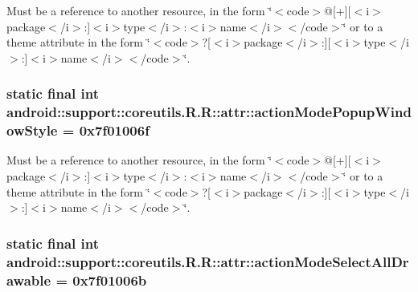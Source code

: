 Must be a reference to another resource, in the form \char`\"{}$<$code$>$@\mbox{[}+\mbox{]}\mbox{[}$<$i$>$package$<$/i$>$:\mbox{]}$<$i$>$type$<$/i$>$:$<$i$>$name$<$/i$>$$<$/code$>$\char`\"{} or to a theme attribute in the form \char`\"{}$<$code$>$?\mbox{[}$<$i$>$package$<$/i$>$:\mbox{]}\mbox{[}$<$i$>$type$<$/i$>$:\mbox{]}$<$i$>$name$<$/i$>$$<$/code$>$\char`\"{}. \hypertarget{classandroid_1_1support_1_1coreutils_1_1_r_1_1attr_e9eb91a12e00c5257b472c451edceb5f}{
\subsubsection[{actionModePopupWindowStyle}]{\setlength{\rightskip}{0pt plus 5cm}static final int android::support::coreutils.R.R::attr::actionModePopupWindowStyle = 0x7f01006f}}
\label{classandroid_1_1support_1_1coreutils_1_1_r_1_1attr_e9eb91a12e00c5257b472c451edceb5f}


Must be a reference to another resource, in the form \char`\"{}$<$code$>$@\mbox{[}+\mbox{]}\mbox{[}$<$i$>$package$<$/i$>$:\mbox{]}$<$i$>$type$<$/i$>$:$<$i$>$name$<$/i$>$$<$/code$>$\char`\"{} or to a theme attribute in the form \char`\"{}$<$code$>$?\mbox{[}$<$i$>$package$<$/i$>$:\mbox{]}\mbox{[}$<$i$>$type$<$/i$>$:\mbox{]}$<$i$>$name$<$/i$>$$<$/code$>$\char`\"{}. \hypertarget{classandroid_1_1support_1_1coreutils_1_1_r_1_1attr_596f5da4acff9096eb6d62dd734e0846}{
\subsubsection[{actionModeSelectAllDrawable}]{\setlength{\rightskip}{0pt plus 5cm}static final int android::support::coreutils.R.R::attr::actionModeSelectAllDrawable = 0x7f01006b}}
\label{classandroid_1_1support_1_1coreutils_1_1_r_1_1attr_596f5da4acff9096eb6d62dd734e0846}


